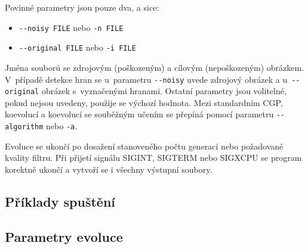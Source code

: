 Povinné parametry jsou pouze dva, a sice:

\begin{itemize}
    \item \texttt{-{}-noisy FILE} nebo \texttt{-n FILE}
    \item \texttt{-{}-original FILE} nebo \texttt{-i FILE}
\end{itemize}

Jména souborů se zdrojovým (poškozeným) a cílovým (nepoškozeným) obrázkem. V~případě detekce hran se u~parametru \texttt{-{}-noisy} uvede zdrojový obrázek a u~\texttt{-{}-original} obrázek s~vyznačenými hranami. Ostatní parametry jsou volitelné, pokud nejsou uvedeny, použije se výchozí hodnota. Mezi standardním CGP, koevolucí a koevolucí se souběžným učením se přepíná pomocí parametru \texttt{-{}-algorithm} nebo \texttt{-a}.

Evoluce se ukončí po dosažení stanoveného počtu generací nebo požadované kvality filtru. Při přijetí signálu SIGINT, SIGTERM nebo SIGXCPU se program korektně ukončí a vytvoří se i všechny výstupní soubory.

\subsection*{Příklady spuštění}


\subsection*{Parametry evoluce}

